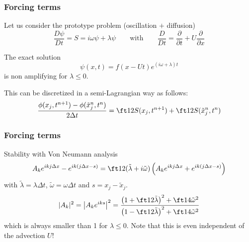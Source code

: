 \documentclass[aspectratio=43,9pt]{beamer}
\begin{document}
\begin{frame}
	\frametitle{Forcing terms}
	\begin{myitemize}{3ex}
		\item Let us consider the prototype problem (oscillation $+$ diffusion)
			\begin{equation*}
				\frac{D \psi}{D t} = S = i \omega \psi + \lambda \psi \qquad \text{with} \qquad \frac{D}{Dt} = \frac{\partial}{\partial t} + U \frac{\partial}{\partial x}
			\end{equation*}
		\item The exact solution
			\begin{equation*}
				\psi(x,t) = f (x - U t) e^{(i \omega + \lambda) t}
			\end{equation*}
			is non amplifying for $\lambda \le 0$.
		\item This can be discretized in a semi-Lagrangian way as follows:
			\begin{equation*}
				\frac{\phi (x_j, t^{n+1}) - \phi (\tilde x_j^{n}, t^{n})}{2 \Delta t} =  \ft12 S(x_j, t^{n+1} )+\ft12 S(\tilde x_j^n,t^n)
			\end{equation*}
	\end{myitemize}
\end{frame}
%
%
\begin{frame}
	\frametitle{Forcing terms}
	\begin{myitemize}{2ex}
		\item Stability with Von Neumann analysis
			\begin{equation*}
				A_k e^{i k j \Delta x} - e^{ik (j \Delta x - s)} = \ft12 (\tilde \lambda + i \tilde \omega ) \left( A_k e^{ikj \Delta x} + e^{ik (j \Delta x -s)}\right)
			\end{equation*}
			with $\tilde \lambda = \lambda \Delta t$, $\tilde \omega = \omega \Delta t$ and $s=x_j-\tilde x_j$.
			\begin{equation*}
				| A_k |^2 = \left| A_k e^{iks} \right|^2 = \frac{ \left( 1 + \ft12 \tilde \lambda  \right)^2 + \ft14 \tilde \omega^2 }{ \left( 1 - \ft12 \tilde \lambda \right)^2 + \ft14 \tilde \omega^2 }
			\end{equation*}
			which is always smaller than 1 for $\lambda \le 0$. Note that this is even independent of the advection $U$!
	\end{myitemize}
\end{frame}
%
\end{document}
